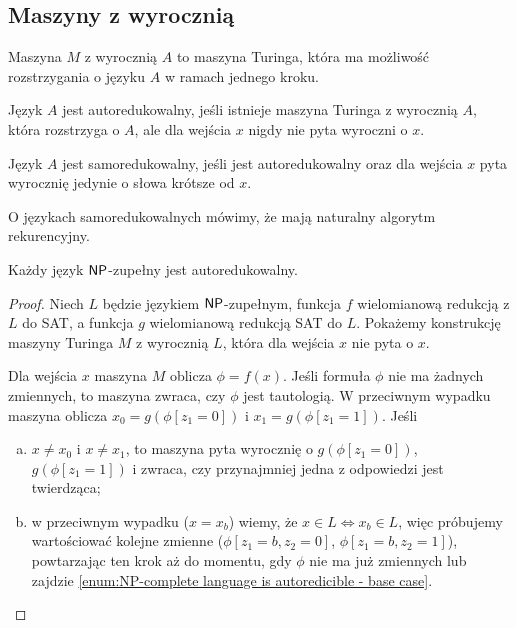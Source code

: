 \subsection{Maszyny z wyrocznią}

Maszyna $M$ z wyrocznią $A$ to maszyna Turinga, która ma możliwość rozstrzygania o języku $A$ w ramach jednego kroku.

\begin{definition}[autoredukcja]
    Język $A$ jest autoredukowalny, jeśli istnieje maszyna Turinga z wyrocznią $A$, która rozstrzyga o $A$, ale dla wejścia $x$ nigdy nie pyta wyroczni o $x$.
\end{definition}

\begin{definition}[samoredukcja]
    Język $A$ jest samoredukowalny, jeśli jest autoredukowalny oraz dla wejścia $x$ pyta wyrocznię jedynie o słowa krótsze od $x$.
\end{definition}

O językach samoredukowalnych mówimy, że mają naturalny algorytm rekurencyjny.

\begin{theorem}
    Każdy język $\textsf{NP}$-zupełny jest autoredukowalny.
\end{theorem}
\begin{proof}
    Niech $L$ będzie językiem $\textsf{NP}$-zupełnym, funkcja $f$ wielomianową redukcją z $L$ do SAT, a funkcja $g$ wielomianową redukcją SAT do $L$. Pokażemy konstrukcję maszyny Turinga $M$ z wyrocznią $L$, która dla wejścia $x$ nie pyta o $x$.

    Dla wejścia $x$ maszyna $M$ oblicza $\phi = f(x)$. Jeśli formuła $\phi$ nie ma żadnych zmiennych, to maszyna zwraca, czy $\phi$ jest tautologią. W przeciwnym wypadku maszyna oblicza $x_0 = g(\phi[z_1 \!=\! 0])$ i $x_1 = g(\phi[z_1 \!=\! 1])$. Jeśli
    \begin{enumerate}[(a)]
        \item $x \neq x_0$ i $x \neq x_1$, to maszyna pyta wyrocznię o $g(\phi[z_1 \!=\! 0])$, $g(\phi[z_1 \!=\! 1])$ i zwraca, czy przynajmniej jedna z odpowiedzi jest twierdząca;\label{enum:NP-complete language is autoredicible - base case}
        \item w przeciwnym wypadku ($x = x_b$) wiemy, że $x \in L \iff x_b \in L$, więc próbujemy wartościować kolejne zmienne ($\phi[z_1 \!=\! b, z_2 \!=\! 0]$, $\phi[z_1 \!=\! b, z_2 \!=\! 1]$), powtarzając ten krok aż do momentu, gdy $\phi$ nie ma już zmiennych lub zajdzie \ref{enum:NP-complete language is autoredicible - base case}.
    \end{enumerate}
\end{proof}

